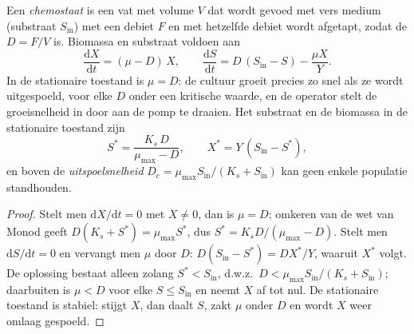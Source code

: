 \begin{theorem}[De chemostaat]\label{thm:b2:microbial-metabolism:chemostat}
Een \emph{chemostaat} is een vat met volume $V$ dat wordt gevoed met
vers medium (substraat $S_{\text{in}}$) met een debiet $F$ en met
hetzelfde debiet wordt afgetapt, zodat de \emph{}
$D = F/V$ is. Biomassa en substraat voldoen aan
\[
\frac{\mathrm{d}X}{\mathrm{d}t} = (\mu - D)\,X, \qquad
\frac{\mathrm{d}S}{\mathrm{d}t} = D\,(S_{\text{in}} - S) - \frac{\mu X}{Y}.
\]
In de stationaire toestand is $\mu = D$: de cultuur groeit precies zo
snel als ze wordt uitgespoeld, voor elke $D$ onder een kritische waarde,
en de operator stelt de groeisnelheid in door aan de pomp te draaien.
Het substraat en de biomassa in de stationaire toestand zijn
\[
S^* = \frac{K_s\,D}{\mu_{\max} - D}, \qquad X^* = Y\,(S_{\text{in}} - S^*),
\]
en boven de \emph{uitspoelsnelheid} $D_c = \mu_{\max}
S_{\text{in}}/(K_s + S_{\text{in}})$ kan geen enkele populatie standhouden.
\end{theorem}
\begin{proof}
Stelt men $\mathrm{d}X/\mathrm{d}t = 0$ met $X \neq 0$, dan is $\mu = D$;
omkeren van de wet van Monod geeft $D(K_s + S^*) = \mu_{\max} S^*$, dus $S^* =
K_s D/(\mu_{\max} - D)$. Stelt men $\mathrm{d}S/\mathrm{d}t = 0$ en
vervangt men $\mu$ door $D$: $D(S_{\text{in}} - S^*) = DX^*/Y$, waaruit
$X^*$ volgt. De oplossing bestaat alleen zolang $S^* < S_{\text{in}}$, d.w.z.\
$D < \mu_{\max} S_{\text{in}}/(K_s + S_{\text{in}})$; daarbuiten is
$\mu < D$ voor elke $S \le S_{\text{in}}$ en neemt $X$ af tot nul. De
stationaire toestand is stabiel: stijgt $X$, dan daalt $S$, zakt $\mu$
onder $D$ en wordt $X$ weer omlaag gespoeld.
\end{proof}

